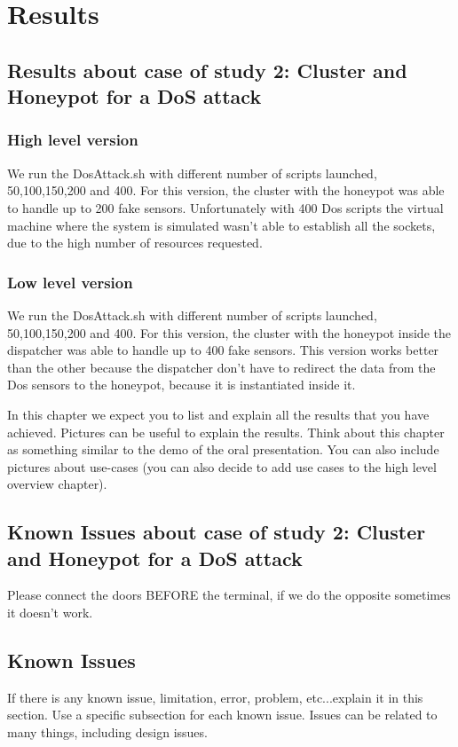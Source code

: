 \chapter{Results}
\section{Results about case of study 2: Cluster and Honeypot for a DoS attack}

\subsection{High level version}
We run the DosAttack.sh with different number of scripts launched, 50,100,150,200 and 400. For this version, the cluster with the honeypot was able to handle up to 200 fake sensors. 
Unfortunately with 400 Dos scripts the virtual machine where the system is simulated wasn't able to establish all the sockets, due to the high number of resources requested.

\subsection{Low level version} 
We run the DosAttack.sh with different number of scripts launched, 50,100,150,200 and 400. For this version, the cluster with the honeypot inside the dispatcher was able to handle
 up to 400 fake sensors. 
This version works better than the other because the dispatcher don't have to redirect the data from the Dos sensors to the honeypot, because it is instantiated inside it.

In this chapter we expect you to list and explain all the results that you have achieved. Pictures can be useful to explain the results. Think about this chapter as something similar to the demo of the oral presentation. You can also include pictures about use-cases (you can also decide to add use cases to the high level overview chapter).
\section{Known Issues about case of study 2: Cluster and Honeypot for a DoS attack}
Please connect the doors BEFORE the terminal, if we do the opposite sometimes it doesn't work.  
\section{Known Issues}
If there is any known issue, limitation, error, problem, etc...explain it in this section. Use a specific subsection for each known issue. Issues can be related to many things, including design issues.
